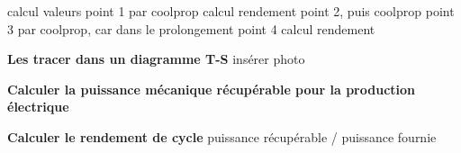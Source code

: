 \documentclass[12pt]{article}
\begin{document}
calcul valeurs point 1 par coolprop
calcul rendement point 2, puis coolprop
point 3 par coolprop, car dans le prolongement
point 4 calcul rendement

\textbf{Les tracer dans un diagramme T-S}
insérer photo

\textbf{Calculer la puissance mécanique récupérable pour la production électrique}

\textbf{Calculer le rendement de cycle}
puissance récupérable / puissance fournie
\end{document}
